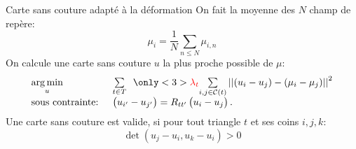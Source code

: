 \begin{frame}{Carte sans couture adapté à la déformation}
    On fait la moyenne des $N$ champ de repère: 
    $$ \mu_i = \frac{1}{N} \sum_{n \leq N} \mu_{i, n} $$
    \pause
    On calcule une carte sans couture $u$ la plus proche possible de $\mu$:
    \begin{equation*} \label{eq:quadcover_energy}
        \begin{array}{ll}
            \underset{u}{\argmin} & \underset{t \in T}{\sum}\ \ \only<3>{\textcolor{red}{\lambda_t}} \underset{i, j \in \mathcal{C}(t)}{\sum} \left|\left| (u_i - u_j) - (\mu_i - \mu_j)  \right|\right|^2\\
            \text{sous contrainte: } & \begin{pmatrix} u_{i'} - u_{j'} \end{pmatrix} = R_{tt'} \begin{pmatrix}  u_{i} - u_{j} \end{pmatrix}. \\
        \end{array}
    \end{equation*}
    \pause
    Une carte sans couture est valide, si pour tout triangle $t$ et ses coins $i, j, k$:
    \begin{equation*}\label{eq:positive_jacobien_2D}
        \det \left(u_{j} - u_{i}, u_{k} - u_{i} \right) > 0
    \end{equation*}
\end{frame}
\fi

